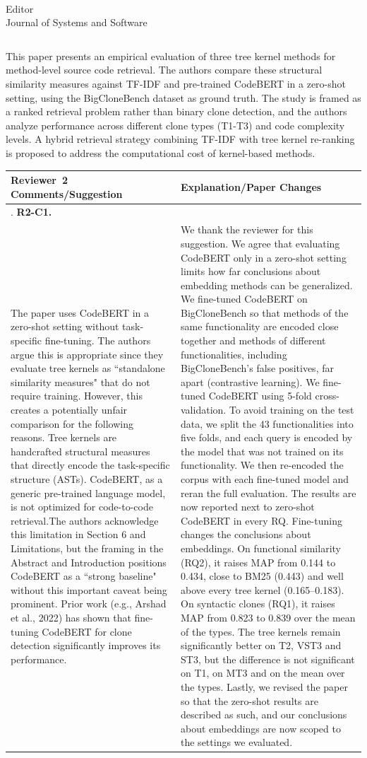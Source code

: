 \documentclass[
pagenumber=false, %
parskip=half, %
fromalign=right, %
foldmarks=false, %
addrfield=false %
]{scrlttr2}
\newcounter{commentcounter} %
\newcommand{\comment}[1]{\refstepcounter{commentcounter}\thecommentcounter.} %
\newcommand{\finetune}{We thank the reviewer for this suggestion. We agree that evaluating CodeBERT only in a zero-shot setting limits how far conclusions about embedding methods can be generalized. We fine-tuned CodeBERT on BigCloneBench so that methods of the same functionality are encoded close together and methods of different functionalities, including BigCloneBench's false positives, far apart (contrastive learning). We fine-tuned CodeBERT using 5-fold cross-validation. To avoid training on the test data, we split the 43 functionalities into five folds, and each query is encoded by the model that was not trained on its functionality.\newline
We then re-encoded the corpus with each fine-tuned model and reran the full evaluation. The results are now reported next to zero-shot CodeBERT in every RQ. Fine-tuning changes the conclusions about embeddings. On functional similarity (RQ2), it raises MAP from 0.144 to 0.434, close to BM25 (0.443) and well above every tree kernel (0.165--0.183). On syntactic clones (RQ1), it raises MAP from 0.823 to 0.839 over the mean of the types. The tree kernels remain significantly better on T2, VST3 and ST3, but the difference is not significant on T1, on MT3 and on the mean over the types. \newline Lastly, we revised the paper so that the zero-shot results are described as such, and our conclusions about embeddings are now scoped to the settings we evaluated. }
\begin{document}
\begin{letter}{\\Editor\\Journal of Systems and Software}
\begin{longtable}{p{}p{}}
		\bottomrule
		\end{longtable}	\pagebreak
		
	 	This paper presents an empirical evaluation of three tree kernel methods for method-level source code retrieval. The authors compare these structural similarity measures against TF-IDF and pre-trained CodeBERT in a zero-shot setting, using the BigCloneBench dataset as ground truth. The study is framed as a ranked retrieval problem rather than binary clone detection, and the authors analyze performance across different clone types (T1-T3) and code complexity levels. A hybrid retrieval strategy combining TF-IDF with tree kernel re-ranking is proposed to address the computational cost of kernel-based methods.
	
		
		
		\begin{longtable}{p{}p{}}
			
			\toprule
			\textbf{Reviewer~2 Comments/Suggestion} & \textbf{Explanation/Paper Changes} \\ \midrule
			\endhead
		
	
		\comment{2}	\textbf{R2-C1.}\\The paper uses CodeBERT in a zero-shot setting without task-specific fine-tuning. The authors argue this is appropriate since they evaluate tree kernels as ``standalone similarity measures" that do not require training. However, this creates a potentially unfair comparison for the following reasons. Tree kernels are handcrafted structural measures that directly encode the task-specific structure (ASTs). CodeBERT, as a generic pre-trained language model, is not optimized for code-to-code retrieval.The authors acknowledge this limitation in Section 6 and Limitations, but the framing in the Abstract and Introduction positions CodeBERT as a ``strong baseline" without this important caveat being prominent. Prior work (e.g., Arshad et al., 2022) has shown that fine-tuning CodeBERT for clone detection significantly improves its performance. & \finetune  \\ \midrule 
		

\end{longtable}
\end{letter}
\end{document}
